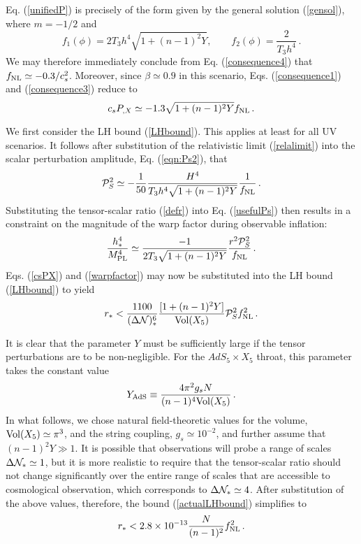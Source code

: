 Eq. (\ref{unifiedP}) is precisely of the form given by the 
general solution (\ref{gensol}), where $m=-1/2$ and 
\begin{equation}
\label{f1}
f_1 (\phi) = 2T_3 h^4 \sqrt{1+(n-1)^2Y} , \qquad 
f_2 (\phi) = \frac{2}{T_3 h^4} \,.
\end{equation}
We may therefore immediately conclude from Eq. (\ref{consequence4}) that $f_{\mathrm{NL}}
\simeq -0.3/c_s^2$. Moreover, since $\beta \simeq 0.9$ in this scenario, 
Eqs. (\ref{consequence1}) and (\ref{consequence3}) reduce to  
\begin{equation}
\label{csPX}
c_sP_{,X} \simeq -1.3 \sqrt{1+(n-1)^2Y} f_{\mathrm{NL}} \,.
\end{equation}

We first consider the LH bound (\ref{LHbound}). This applies at least for all
UV scenarios. It follows after substitution of the relativistic limit
(\ref{relalimit}) into the scalar perturbation amplitude, Eq. (\ref{eqn:Ps2}),
that 
\begin{equation}
\label{usefulPs}
\mathcal{P}_S^2 \simeq -\frac{1}{50} \frac{H^4}{T_3 h^4\sqrt{1+(n-1)^2Y}}
\frac{1}{f_{\mathrm{NL}}}\,.
\end{equation}
Substituting the tensor-scalar ratio (\ref{defr}) into  
Eq. (\ref{usefulPs}) then results in a constraint on the magnitude of 
the warp factor during observable inflation: 
\begin{equation}
\label{warpfactor}
\frac{h^4_*}{M_{\mathrm{PL}}^4} \simeq \frac{-1}{2 T_3 \sqrt{1+(n-1)^2Y}} 
\frac{r^2 \mathcal{P}_S^2}{f_{\mathrm{NL}}} \,.
\end{equation}
Eqs. (\ref{csPX}) and (\ref{warpfactor}) may now be substituted into 
the LH bound (\ref{LHbound}) to yield 
\begin{equation}
\label{actualLHbound}
r_* < \frac{1100}{(\Delta {\cal{N}} )_*^6} 
\frac{[1+(n-1)^2Y]}{\mathrm{Vol} (X_5)} \mathcal{P}_S^2 f_{\mathrm{NL}}^2 \,.
\end{equation}

It is clear that the parameter $Y$ 
must be sufficiently large if the tensor perturbations 
are to be non-negligible. For the $AdS_5 \times X_5$ throat, this parameter  
takes the constant value    
\begin{equation}
\label{eqn:YAds}
Y_{\mathrm{AdS}} \equiv \frac{4\pi^2 g_s N}{(n-1)^4 \mathrm{Vol} (X_5)} \,.
\end{equation}
In what follows, we chose natural field-theoretic values for the volume, 
$\mathrm{Vol} (X_5) \simeq \pi^3$, and the string coupling, 
$g_s \simeq 10^{-2}$, and further assume that 
$(n-1)^2 Y \gg 1$. It is possible that observations will probe a 
range of scales $\Delta {\cal{N}}_* \simeq 1$, 
but it is more realistic to require that 
the tensor-scalar ratio should not change significantly over the 
entire range of scales that are accessible to cosmological observation,  
which corresponds to $\Delta {\cal{N}}_* \simeq 4$.
After substitution of the above values, therefore, 
the bound (\ref{actualLHbound}) simplifies to 
\begin{equation}
\label{adsupperbound}
r_* < 2.8 \times 10^{-13} \frac{N}{(n-1)^2} f_{\mathrm{NL}}^2 \,.
\end{equation}

